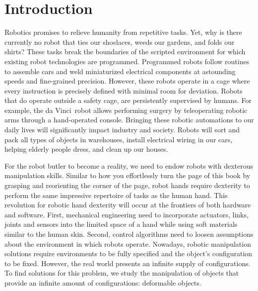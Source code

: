 \documentclass[\home/main.tex]{subfiles}
\begin{document}
\chapter{Introduction}\label{ch:introduction}
Robotics promises to relieve humanity from repetitive tasks. Yet, why is there currently no robot that ties our shoelaces, weeds our gardens, and folds our shirts?
These tasks break the boundaries of the scripted environment for which existing robot technologies are programmed. Programmed robots follow routines to assemble cars and weld miniaturized electrical components at astounding speeds and fine-grained precision. However, these robots operate in a cage where every instruction is precisely defined with minimal room for deviation. Robots that do operate outside a safety cage, are persistently supervised by humans. For example, the da Vinci\textregistered\ robot allows performing surgery by teleoperating robotic arms through a hand-operated console.
Bringing these robotic automations to our daily lives will significantly impact industry and society. Robots will sort and pack all types of objects in warehouses, install electrical wiring in our cars, helping elderly people dress, and clean up our houses.

For the robot butler to become a reality, we need to endow robots with dexterous manipulation skills. Similar to how you effortlessly turn the page of this book by grasping and reorienting the corner of the page, robot hands require dexterity to perform the same impressive repertoire of tasks as the human hand. This revolution for robotic hand dexterity will occur at the frontiers of both hardware and software. First, mechanical engineering need to incorporate actuators, links, joints and sensors into the limited space of a hand while using soft materials similar to the human skin. Second, control algorithms need to loosen assumptions about the environment in which robots operate. Nowadays, robotic manipulation solutions require environments to be fully specified and the object's configuration to be fixed.
However, the real world presents an infinite supply of configurations.
To find solutions for this problem, we study the manipulation of objects that provide an infinite amount of configurations: deformable objects.
\end{document}
